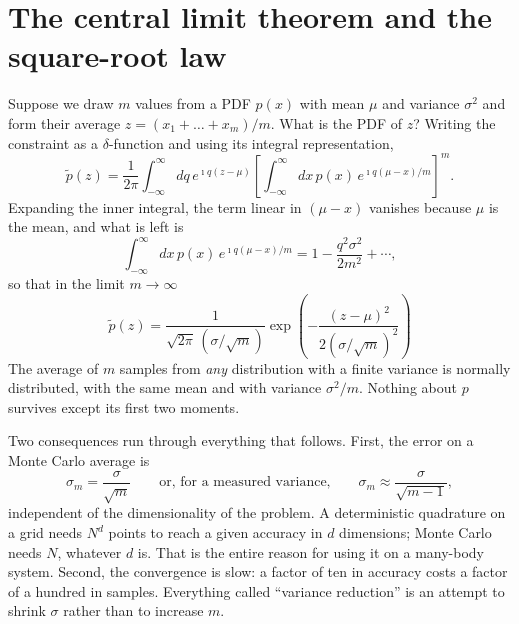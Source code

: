 \section{The central limit theorem and the square-root law}
\label{sec:clt}

Suppose we draw $m$ values from a PDF $p(x)$ with mean $\mu$ and variance
$\sigma^2$ and form their average $z=(x_1+\dots+x_m)/m$.  What is the PDF of
$z$?  Writing the constraint as a $\delta$-function and using its integral
representation,
\begin{equation}
  \tilde{p}(z) = \frac{1}{2\pi}\int_{-\infty}^{\infty}\!dq\,
    e^{\imath q(z-\mu)}
    \left[\int_{-\infty}^{\infty}\!dx\,p(x)\,
      e^{\imath q(\mu-x)/m}\right]^m .
  \label{eq:12-cltintegral}
\end{equation}
Expanding the inner integral, the term linear in $(\mu-x)$ vanishes because
$\mu$ is the mean, and what is left is
\begin{equation}
  \int_{-\infty}^{\infty}\!dx\,p(x)\,e^{\imath q(\mu-x)/m}
   = 1 - \frac{q^2\sigma^2}{2m^2} + \cdots ,
  \label{eq:12-cltexpansion}
\end{equation}
so that in the limit $m\to\infty$
\begin{equation}
  \boxed{\;
  \tilde{p}(z) = \frac{1}{\sqrt{2\pi}\,(\sigma/\sqrt{m})}
    \exp\left(-\frac{(z-\mu)^2}{2(\sigma/\sqrt{m})^2}\right) \;}
  \label{eq:12-clt}
\end{equation}
The average of $m$ samples from \emph{any} distribution with a finite
variance is normally distributed, with the same mean and with variance
$\sigma^2/m$.  Nothing about $p$ survives except its first two moments.

Two consequences run through everything that follows.  First, the error on a
Monte Carlo average is
\begin{equation}
  \sigma_m = \frac{\sigma}{\sqrt{m}}
  \qquad\text{or, for a measured variance,}\qquad
  \sigma_m \approx \frac{\sigma}{\sqrt{m-1}} ,
  \label{eq:12-sqrtlaw}
\end{equation}
independent of the dimensionality of the problem.  A deterministic quadrature
on a grid needs $N^d$ points to reach a given accuracy in $d$ dimensions;
Monte Carlo needs $N$, whatever $d$ is.  That is the entire reason for using
it on a many-body system.  Second, the convergence is slow: a factor of ten in
accuracy costs a factor of a hundred in samples.  Everything called
``variance reduction'' is an attempt to shrink $\sigma$ rather than to
increase $m$.


